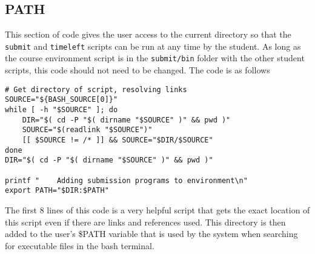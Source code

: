 \documentclass{article}
\begin{document}
\subsection*{PATH}
This section of code gives the user access to the current directory so that the \verb|submit| and \verb|timeleft| scripts can be run at any time by the student. As long as the course environment script is in the \verb|submit/bin| folder with the other student scripts, this code should not need to be changed. The code is as follows
\begin{verbatim}
# Get directory of script, resolving links
SOURCE="${BASH_SOURCE[0]}"
while [ -h "$SOURCE" ]; do
    DIR="$( cd -P "$( dirname "$SOURCE" )" && pwd )"
    SOURCE="$(readlink "$SOURCE")"
    [[ $SOURCE != /* ]] && SOURCE="$DIR/$SOURCE"
done
DIR="$( cd -P "$( dirname "$SOURCE" )" && pwd )"

printf "    Adding submission programs to environment\n"
export PATH="$DIR:$PATH"
\end{verbatim}
The first 8 lines of this code is a very helpful script that gets the exact location of this script even if there are links and references used. This directory is then added to the user's \$PATH variable that is used by the system when searching for executable files in the bash terminal.
\end{document}
